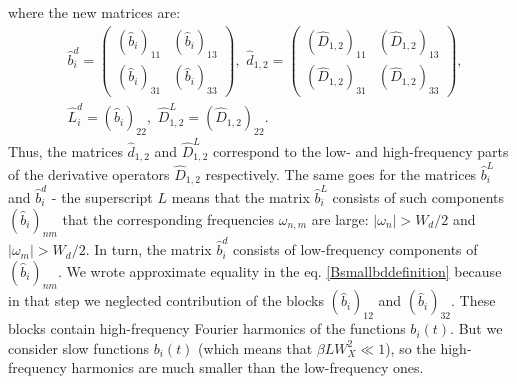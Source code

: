 \documentclass{article}
\begin{document}
where the new matrices are: 
\begin{align}
    &\hat{b}_{i}^{d} = 
    \begin{pmatrix} 
    (\hat{b}_{i})_{11} & (\hat{b}_{i})_{13}\\
    (\hat{b}_{i})_{31} & (\hat{b}_{i})_{33}
    \end{pmatrix}, \,\, 
    \hat{d}_{1,2} =  \begin{pmatrix} 
    (\hat{D}_{1,2})_{11} & (\hat{D}_{1,2})_{13}\\
    (\hat{D}_{1,2})_{31} & (\hat{D}_{1,2})_{33}
    \end{pmatrix},\nonumber\\
    &\hat{L}_{i}^{d} = (\hat{b}_{i})_{22}, \,\, 
    \hat{D}_{1,2}^{L} =  (\hat{D}_{1,2})_{22}.
\end{align}
Thus, the matrices $\hat{d}_{1,2}$ and $\hat{D}_{1,2}^{L}$ correspond to the low- and high-frequency parts of the derivative operators $\hat{D}_{1,2}$ respectively. The same goes for the matrices $\hat{b}_{i}^{L}$ and $\hat{b}_{i}^{d}$ - the superscript $L$ means that the matrix $\hat{b}_{i}^{L}$ consists of such components $(\hat{b}_{i})_{nm}$ that the corresponding frequencies $\omega_{n,m}$ are large: $|\omega_{n}|>W_{d}/2$ and $|\omega_{m}|>W_{d}/2$. In turn, the matrix $\hat{b}_{i}^{d}$ consists of low-frequency components of $(\hat{b}_{i})_{nm}$. We wrote approximate equality in the eq. \eqref{Bsmallbddefinition} because in that step we neglected contribution of the blocks $(\hat{b}_{i})_{12}$ and $(\hat{b}_{i})_{32}$. These blocks contain high-frequency Fourier harmonics of the functions $b_{i}(t)$. But we consider slow functions $b_{i}(t)$ (which means that $\beta L W_{X}^{2} \ll 1$), so the high-frequency harmonics are much smaller than the low-frequency ones.
\end{document}
